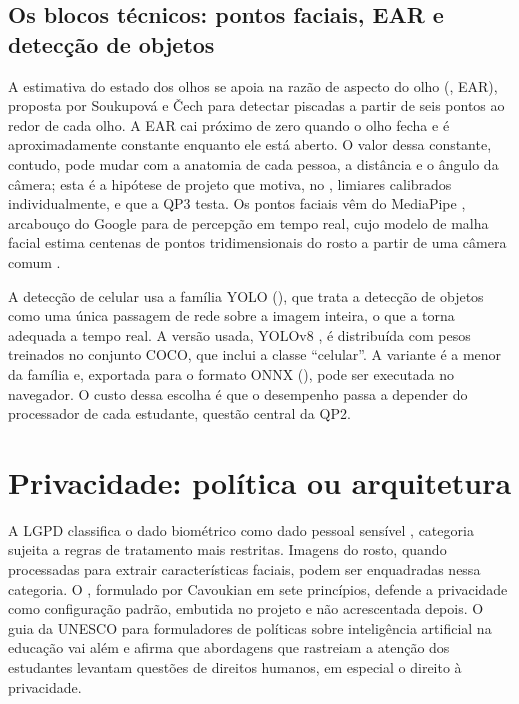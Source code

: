 \subsection{Os blocos técnicos: pontos faciais, EAR e detecção de objetos}

A estimativa do estado dos olhos se apoia na razão de aspecto do olho (, EAR), proposta por Soukupová e Čech \cite{SC16} para detectar piscadas a partir de seis pontos ao redor de cada olho. A EAR cai próximo de zero quando o olho fecha e é aproximadamente constante enquanto ele está aberto. O valor dessa constante, contudo, pode mudar com a anatomia de cada pessoa, a distância e o ângulo da câmera; esta é a hipótese de projeto que motiva, no \ferramenta, limiares calibrados individualmente, e que a QP3 testa. Os pontos faciais vêm do MediaPipe \cite{LTN19}, arcabouço do Google para  de percepção em tempo real, cujo modelo de malha facial estima centenas de pontos tridimensionais do rosto a partir de uma câmera comum \cite{KAGG19}.

A detecção de celular usa a família YOLO (), que trata a detecção de objetos como uma única passagem de rede sobre a imagem inteira, o que a torna adequada a tempo real. A versão usada, YOLOv8 \cite{JCQ23}, é distribuída com pesos treinados no conjunto COCO, que inclui a classe ``celular''. A variante  é a menor da família e, exportada para o formato ONNX (), pode ser executada no navegador. O custo dessa escolha é que o desempenho passa a depender do processador de cada estudante, questão central da QP2.

\section{\label{sec:privacidade}Privacidade: política ou arquitetura}

A LGPD classifica o dado biométrico como dado pessoal sensível \cite{Bra18}, categoria sujeita a regras de tratamento mais restritas. Imagens do rosto, quando processadas para extrair características faciais, podem ser enquadradas nessa categoria. O , formulado por Cavoukian \cite{Cav09} em sete princípios, defende a privacidade como configuração padrão, embutida no projeto e não acrescentada depois. O guia da UNESCO para formuladores de políticas sobre inteligência artificial na educação \cite{UNE21} vai além e afirma que abordagens que rastreiam a atenção dos estudantes levantam questões de direitos humanos, em especial o direito à privacidade.


